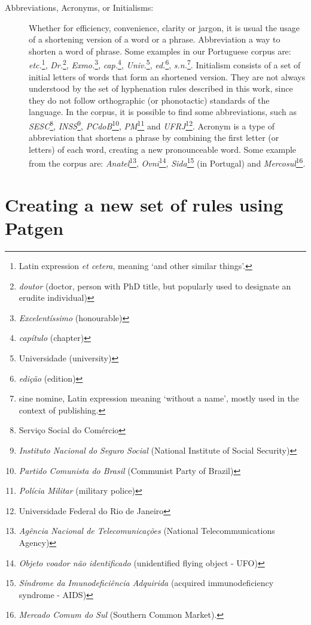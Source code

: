 \documentclass{article}
\begin{document}
\begin{description}
    \item[Abbreviations, Acronyms, or Initialisms:] Whether for efficiency, 
	convenience, clarity or jargon, it is usual the usage of a shortening 
	version of a word or a phrase. 
	Abbreviation a way to shorten a word of phrase. Some examples in our
	Portuguese corpus are: 
	\emph{etc.}\footnote{Latin expression \emph{et cetera}, meaning 
	`and other similar things'.}, 
	\emph{Dr.}\footnote{\emph{doutor} (doctor, person with PhD title, but popularly used to designate an erudite individual)}, 
	\emph{Exmo.}\footnote{\emph{Excelentíssimo} (honourable)},
	\emph{cap.}\footnote{\emph{capítulo} (chapter)}, \emph{Univ.}\footnote{Universidade (university)}, 
	\emph{ed.}\footnote{\emph{edição} (edition)}, 
	\emph{s.n.}\footnote{sine nomine, Latin expression meaning `without a name', 
	mostly used in the context of publishing.}.
	Initialism consists of a set of initial 
	letters of words that form an shortened version. They are not always 
	understood by the set of hyphenation rules described in this work, 
	since they do not follow orthographic (or phonotactic) standards of 
	the language. In the corpus, it is possible to find some abbreviations, 
	such as \emph{SESC}\footnote{Serviço Social do Comércio}, 
	\emph{INSS}\footnote{\emph{Instituto Nacional do Seguro Social} (National Institute of Social Security)}, 
	\emph{PCdoB}\footnote{\emph{Partido Comunista do Brasil} (Communist Party of Brazil)},
	\emph{PM}\footnote{\emph{Polícia Militar} (military police)} and 
	\emph{UFRJ}\footnote{Universidade Federal do Rio de Janeiro}.
	Acronym is a type of abbreviation that shortens a phrase by combining
	the first letter (or letters) of each word, creating a new pronounceable word.
	Some example from the corpus are: 
	\emph{Anatel}\footnote{\emph{Agência Nacional de Telecomunicações} (National Telecommunications Agency)},
	\emph{Ovni}\footnote{\emph{Objeto voador não identificado} (unidentified flying object - UFO)},
	\emph{Sida}\footnote{\emph{Síndrome da Imunodeficiência Adquirida} (acquired immunodeficiency syndrome - AIDS)} (in Portugal) and
	\emph{Mercosul}\footnote{\emph{Mercado Comum do Sul} (Southern Common Market).}.
\end{description}


\section{Creating a new set of rules using Patgen}
\end{document}
